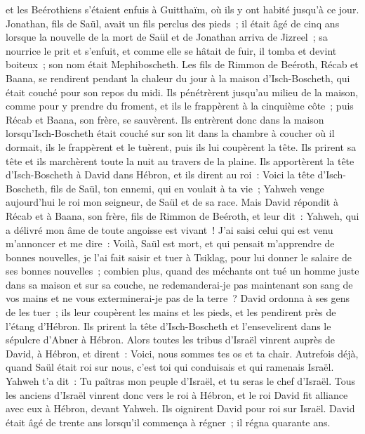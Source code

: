 \begin{multicols}{2}
et les Beérothiens s'étaient enfuis à Guitthaïm, où ils y ont habité jusqu'à ce jour.
Jonathan, fils de Saül, avait un fils perclus des pieds~; il était âgé de cinq ans lorsque la nouvelle de la mort de Saül et de Jonathan arriva de Jizreel~; sa nourrice le prit et s'enfuit, et comme elle se hâtait de fuir, il tomba et devint boiteux~; son nom était Mephiboscheth.
Les fils de Rimmon de Beéroth, Récab et Baana, se rendirent pendant la chaleur du jour à la maison d'Isch-Boscheth, qui était couché pour son repos du midi.
Ils pénétrèrent jusqu'au milieu de la maison, comme pour y prendre du froment, et ils le frappèrent à la cinquième côte~; puis Récab et Baana, son frère, se sauvèrent.
Ils entrèrent donc dans la maison lorsqu'Isch-Boscheth était couché sur son lit dans la chambre à coucher où il dormait, ils le frappèrent et le tuèrent, puis ils lui coupèrent la tête. Ils prirent sa tête et ils marchèrent toute la nuit au travers de la plaine.
Ils apportèrent la tête d'Isch-Boscheth à David dans Hébron, et ils dirent au roi~: Voici la tête d'Isch-Boscheth, fils de Saül, ton ennemi, qui en voulait à ta vie~; Yahweh venge aujourd'hui le roi mon seigneur, de Saül et de sa race.
Mais David répondit à Récab et à Baana, son frère, fils de Rimmon de Beéroth, et leur dit~: Yahweh, qui a délivré mon âme de toute angoisse est vivant~!
J'ai saisi celui qui est venu m'annoncer et me dire~: Voilà, Saül est mort, et qui pensait m'apprendre de bonnes nouvelles, je l'ai fait saisir et tuer à Tsiklag, pour lui donner le salaire de ses bonnes nouvelles~;
combien plus, quand des méchants ont tué un homme juste dans sa maison et sur sa couche, ne redemanderai-je pas maintenant son sang de vos mains et ne vous exterminerai-je pas de la terre~?
David ordonna à ses gens de les tuer~; ils leur coupèrent les mains et les pieds, et les pendirent près de l'étang d'Hébron. Ils prirent la tête d'Isch-Boscheth et l'ensevelirent dans le sépulcre d'Abner à Hébron.
\VerseOne{}Alors toutes les tribus d'Israël vinrent auprès de David, à Hébron, et dirent~: Voici, nous sommes tes os et ta chair.
Autrefois déjà, quand Saül était roi sur nous, c'est toi qui conduisais et qui ramenais Israël. Yahweh t'a dit~: Tu paîtras mon peuple d'Israël, et tu seras le chef d'Israël.
Tous les anciens d'Israël vinrent donc vers le roi à Hébron, et le roi David fit alliance avec eux à Hébron, devant Yahweh. Ils oignirent David pour roi sur Israël.
David était âgé de trente ans lorsqu'il commença à régner~; il régna quarante ans.

\end{multicols}

